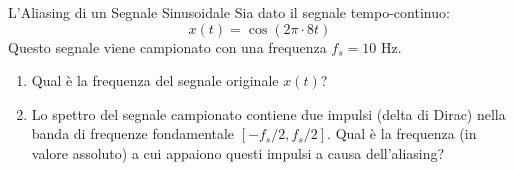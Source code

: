 
\begin{esercizio}{L'Aliasing di un Segnale Sinusoidale}
    Sia dato il segnale tempo-continuo:
    \[
        x(t) = \cos(2\pi \cdot 8t)
    \]
    Questo segnale viene campionato con una frequenza $f_s = 10$ Hz.
    
    \begin{enumerate}
        \item Qual è la frequenza del segnale originale $x(t)$?
        \item Lo spettro del segnale campionato contiene due impulsi (delta di Dirac) nella banda di frequenze fondamentale $[ -f_s/2, f_s/2 ]$. Qual è la frequenza (in valore assoluto) a cui appaiono questi impulsi a causa dell'aliasing?
    \end{enumerate}
\end{esercizio}